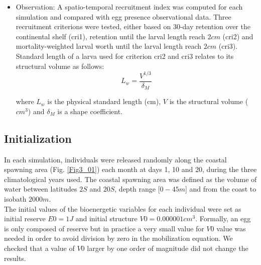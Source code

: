 \begin{itemize}

\item Observation: A spatio-temporal recruitment index was computed for each simulation and compared with egg presence observational data. Three recruitment criterions were tested, either based on 30-day retention over the continental shelf (\gls{cri1}), retention until the larval length reach $2 cm$ (\gls{cri2}) and mortality-weighted larval worth until the larval length reach $2 cm$ (\gls{cri3}). Standard length of a larva used for criterion \gls{cri2} and \gls{cri3} relates to its structural volume as follows:\\

\begin{equation}
	L_{w} = \frac
				{V^{1/3}}
				{\delta_{M}}
	\label{L_W}
\end{equation}

where $L_{w}$ is the physical standard length (cm), $V$ is the structural volume ($cm^3$) 
and $\delta_{M}$ is a shape coefficient.\\

\end{itemize}

\subsection{Initialization}
In each simulation, individuals were released randomly along the coastal spawning area (Fig. \ref{Fig3_01}) each month at days 1, 10 and 20, during the three climatological years used. The coastal spawning area was defined as the volume of water between latitudes $2$\textdegree $S$ and $20$\textdegree $S$, depth range [$0 - 45 m$] and from the coast to isobath $2000 m$.\\

The initial values of the bioenergetic variables for each individual were set as initial reserve $E0=1J$ and initial structure $V0=0.000001cm^3$. Formally, an egg is only composed of reserve but in practice a very small value for $V0$ value was needed in order to avoid division by zero in the mobilization equation. We checked that a value of $V0$ larger by one order of magnitude did not change the results.\\

